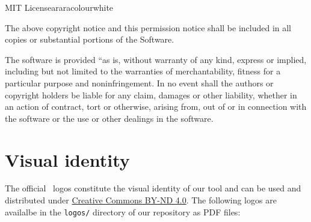 \documentclass[a4paper,twoside,12pt]{memoir}
\begin{document}
\begin{messagebox}{MIT License}{araracolour}{\icinfo}{white}
\vspace{1em}

The above copyright notice and this permission notice shall be included in all copies or substantial portions of the Software.

\vspace{1em}

The software is provided ``as is, without warranty of any kind, express or implied, including but not limited to the warranties of merchantability, fitness for a particular purpose and noninfringement. In no event shall the authors or copyright holders be liable for any claim, damages or other liability, whether in an action of contract, tort or otherwise, arising from, out of or in connection with the software or the use or other dealings in the software.
\end{messagebox}

\section*{Visual identity}

The official \arara\ logos constitute the visual identity of our tool and can be used and distributed under \href{https://creativecommons.org/licenses/by-nd/4.0/}{Creative Commons BY-ND 4.0}. The following logos are availalbe in the \verb|logos/| directory of our repository as PDF files:
\end{document}
